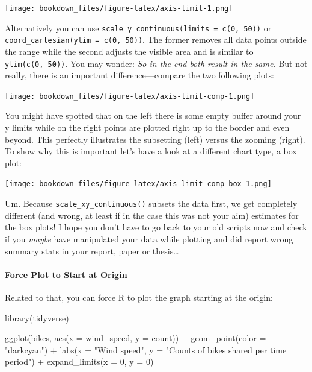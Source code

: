 \documentclass[
]{krantz}
\makeatletter
\newenvironment{Shaded}{\begin{snugshade}}{\end{snugshade}}
\newcommand{\AttributeTok}[1]{\textcolor[rgb]{0.61,0.61,0.61}{#1}}
\newcommand{\DecValTok}[1]{\textcolor[rgb]{0.06,0.06,0.06}{#1}}
\newcommand{\FunctionTok}[1]{\textcolor[rgb]{0,0,0}{#1}}
\newcommand{\NormalTok}[1]{#1}
\newcommand{\SpecialCharTok}[1]{\textcolor[rgb]{0,0,0}{#1}}
\newcommand{\StringTok}[1]{\textcolor[rgb]{0.5,0.5,0.5}{#1}}
\newenvironment{kframe}{%
\medskip{}
\setlength{\fboxsep}{.8em}
 \def\at@end@of@kframe{}%
 \ifinner\ifhmode%
  \def\at@end@of@kframe{\end{minipage}}%
  \begin{minipage}{\columnwidth}%
 \fi\fi%
 \def\FrameCommand##1{\hskip\@totalleftmargin \hskip-\fboxsep
 \colorbox{shadecolor}{##1}\hskip-\fboxsep
     \hskip-\linewidth \hskip-\@totalleftmargin \hskip\columnwidth}%
 \MakeFramed {\advance\hsize-\width
   \@totalleftmargin\z@ \linewidth\hsize
   \@setminipage}}%
 {\par\unskip\endMakeFramed%
 \at@end@of@kframe}
\renewenvironment{Shaded}{\begin{kframe}}{\end{kframe}}
\makeatother
\begin{document}
\texttt{[image: bookdown\_files/figure-latex/axis-limit-1.png]}

Alternatively you can use \texttt{scale\_y\_continuous(limits\ =\ c(0,\ 50))} or \texttt{coord\_cartesian(ylim\ =\ c(0,\ 50))}. The former removes all data points outside the range while the second adjusts the visible area and is similar to \texttt{ylim(c(0,\ 50))}. You may wonder: \emph{So in the end both result in the same.} But not really, there is an important difference---compare the two following plots:

\texttt{[image: bookdown\_files/figure-latex/axis-limit-comp-1.png]}

You might have spotted that on the left there is some empty buffer around your y limits while on the right points are plotted right up to the border and even beyond. This perfectly illustrates the subsetting (left) versus the zooming (right). To show why this is important let's have a look at a different chart type, a box plot:

\texttt{[image: bookdown\_files/figure-latex/axis-limit-comp-box-1.png]}

Um. Because \texttt{scale\_x\textbar{}y\_continuous()} subsets the data first, we get completely different (and wrong, at least if in the case this was not your aim) estimates for the box plots! I hope you don't have to go back to your old scripts now and check if you \emph{maybe} have manipulated your data while plotting and did report wrong summary stats in your report, paper or thesis\ldots{}

\hypertarget{force-plot-to-start-at-origin}{%
\paragraph{Force Plot to Start at Origin}\label{force-plot-to-start-at-origin}}

Related to that, you can force R to plot the graph starting at the origin:

\begin{Shaded}
\begin{Highlighting}[]
\FunctionTok{library}\NormalTok{(tidyverse)}

\FunctionTok{ggplot}\NormalTok{(bikes, }\FunctionTok{aes}\NormalTok{(}\AttributeTok{x =}\NormalTok{ wind\_speed, }\AttributeTok{y =}\NormalTok{ count)) }\SpecialCharTok{+}
  \FunctionTok{geom\_point}\NormalTok{(}\AttributeTok{color =} \StringTok{"darkcyan"}\NormalTok{) }\SpecialCharTok{+}
  \FunctionTok{labs}\NormalTok{(}\AttributeTok{x =} \StringTok{"Wind speed"}\NormalTok{,}
       \AttributeTok{y =} \StringTok{"Counts of bikes shared per time period"}\NormalTok{) }\SpecialCharTok{+}
  \FunctionTok{expand\_limits}\NormalTok{(}\AttributeTok{x =} \DecValTok{0}\NormalTok{, }\AttributeTok{y =} \DecValTok{0}\NormalTok{)}
\end{Highlighting}
\end{Shaded}
\end{document}
